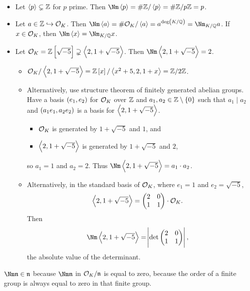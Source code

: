 \begin{example*}
\hfill
\begin{itemize}
\item Let $ \left\langle p \right\rangle \subsetneq \mathbb{Z} $ for $ p $ prime. Then $ \Nm \abr{p} = \#\ZZ / \abr{p} = \#\ZZ / p\ZZ = p $.
\item Let $ a \in \mathbb{Z} \hookrightarrow \mathcal{O}_K $. Then $ \Nm \abr{a} = \#\OOO_K / \abr{a} = a^{\deg \br{K / \QQ}} = \Nm_{K / \QQ} a $. If $ x \in \mathcal{O}_K $, then $ \Nm \abr{x} = \Nm_{K / \QQ} x $.

\pagebreak

\item Let $ \OOO_K = \ZZ\sbr{\sqrt{-5}} \supsetneq \abr{2, 1 + \sqrt{-5}} $. Then $ \Nm \abr{2, 1 + \sqrt{-5}} = 2 $.
\begin{itemize}
\item $ \OOO_K / \abr{2, 1 + \sqrt{-5}} = \ZZ\sbr{x} / \abr{x^2 + 5, 2, 1 + x} = \ZZ / 2\ZZ $.
\item Alternatively, use structure theorem of finitely generated abelian groups. Have a basis $ \br{e_1, e_2} $ for $ \mathcal{O}_K $ over $ \mathbb{Z} $ and $ a_1, a_2 \in \ZZ \setminus \cbr{0} $ such that $ a_1 \mid a_2 $ and $ \br{a_1e_1, a_2e_2} $ is a basis for $ \left\langle 2, 1 + \sqrt{-5} \right\rangle $.
\begin{itemize}
\item $ \mathcal{O}_K $ is generated by $ 1 + \sqrt{-5} $ and $ 1 $, and
\item $ \left\langle 2, 1 + \sqrt{-5} \right\rangle $ is generated by $ 1 + \sqrt{-5} $ and $ 2 $,
\end{itemize}
so $ a_1 = 1 $ and $ a_2 = 2 $. Thus $ \Nm \abr{2, 1 + \sqrt{-5}} = a_1 \cdot a_2 $.
\item Alternatively, in the standard basis of $ \mathcal{O}_K $, where $ e_1 = 1 $ and $ e_2 = \sqrt{-5} $,
$$ \left\langle 2, 1 + \sqrt{-5} \right\rangle = \begin{pmatrix} 2 & 0 \\ 1 & 1 \end{pmatrix} \cdot \mathcal{O}_K. $$
Then
$$ \Nm \abr{2, 1 + \sqrt{-5}} = \abs{\det \twobytwo{2}{0}{1}{1}}, $$
the absolute value of the determinant.
\end{itemize}
\end{itemize}
\end{example*}


\begin{remark*}
$ \Nm \nnn \in \nnn $ because $ \Nm \nnn $ in $ \mathcal{O}_K / \mathfrak{n} $ is equal to zero, because the order of a finite group is always equal to zero in that finite group.
\end{remark*}


